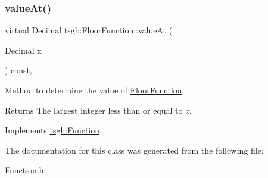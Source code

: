 \subsubsection{\texorpdfstring{value\+At()}{valueAt()}}
{\footnotesize\ttfamily virtual Decimal tsgl\+::\+Floor\+Function\+::value\+At (\begin{DoxyParamCaption}\item[{Decimal}]{x }\end{DoxyParamCaption}) const\hspace{0.3cm}{\ttfamily [inline]}, {\ttfamily [virtual]}}



Method to determine the value of \hyperlink{classtsgl_1_1_floor_function}{Floor\+Function}. 

\begin{DoxyReturn}{Returns}
The largest integer less than or equal to {\itshape x}. 
\end{DoxyReturn}


Implements \hyperlink{classtsgl_1_1_function_affb7b3b19a04efefa29a9870d666e912}{tsgl\+::\+Function}.



The documentation for this class was generated from the following file\+:\begin{DoxyCompactItemize}
\item 
Function.\+h\end{DoxyCompactItemize}
